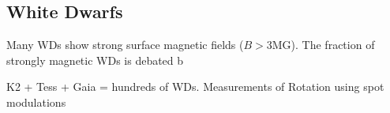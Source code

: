 {\color{red} \subsection{White Dwarfs}}
Many WDs show strong surface magnetic fields ($B>$3MG). The fraction of strongly magnetic WDs is debated b 

K2 + Tess + Gaia = hundreds of WDs. Measurements of Rotation using spot modulations